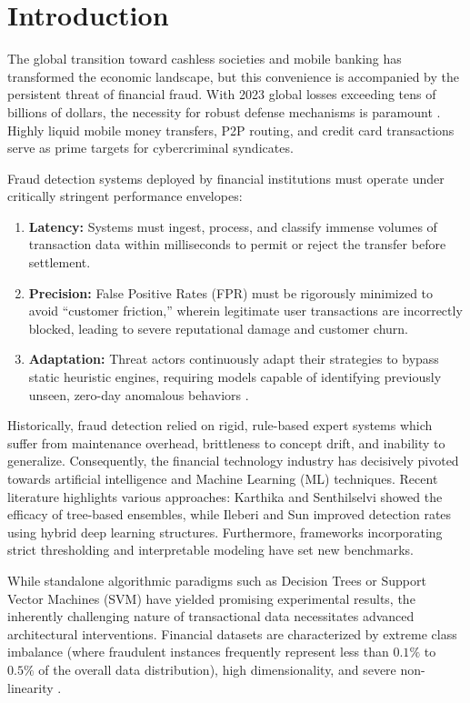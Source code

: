 \documentclass[conference]{IEEEtran}
\begin{document}
\section{Introduction}
\label{sec:intro}
The global transition toward cashless societies and mobile banking has transformed the economic landscape, but this convenience is accompanied by the persistent threat of financial fraud. With 2023 global losses exceeding tens of billions of dollars, the necessity for robust defense mechanisms is paramount \cite{karthika2022, hassan2023}. Highly liquid mobile money transfers, P2P routing, and credit card transactions serve as prime targets for cybercriminal syndicates.

Fraud detection systems deployed by financial institutions must operate under critically stringent performance envelopes:
\begin{enumerate}
    \item \textbf{Latency:} Systems must ingest, process, and classify immense volumes of transaction data within milliseconds to permit or reject the transfer before settlement.
    \item \textbf{Precision:} False Positive Rates (FPR) must be rigorously minimized to avoid ``customer friction,'' wherein legitimate user transactions are incorrectly blocked, leading to severe reputational damage and customer churn.
    \item \textbf{Adaptation:} Threat actors continuously adapt their strategies to bypass static heuristic engines, requiring models capable of identifying previously unseen, zero-day anomalous behaviors \cite{ranjan2024}.
\end{enumerate}

Historically, fraud detection relied on rigid, rule-based expert systems which suffer from maintenance overhead, brittleness to concept drift, and inability to generalize. Consequently, the financial technology industry has decisively pivoted towards artificial intelligence and Machine Learning (ML) techniques. Recent literature highlights various approaches: Karthika and Senthilselvi \cite{karthika2022} showed the efficacy of tree-based ensembles, while Ileberi and Sun \cite{ileberi2024} improved detection rates using hybrid deep learning structures. Furthermore, frameworks incorporating strict thresholding \cite{almubark2024} and interpretable modeling \cite{hassan2023} have set new benchmarks. 

While standalone algorithmic paradigms such as Decision Trees or Support Vector Machines (SVM) have yielded promising experimental results, the inherently challenging nature of transactional data necessitates advanced architectural interventions. Financial datasets are characterized by extreme class imbalance (where fraudulent instances frequently represent less than $0.1\%$ to $0.5\%$ of the overall data distribution), high dimensionality, and severe non-linearity \cite{almubark2024}.
\end{document}
